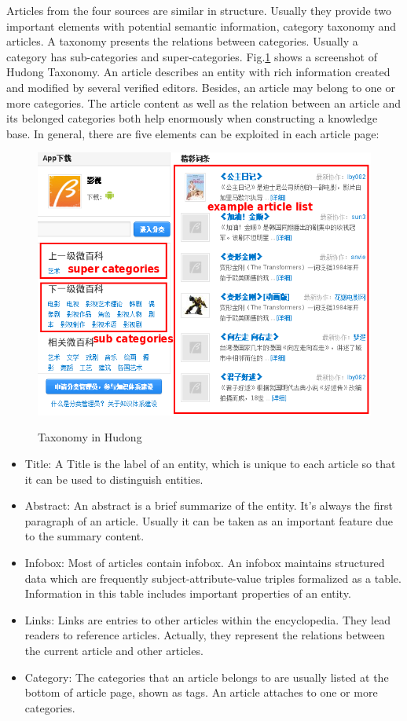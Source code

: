 \documentclass[runningheads,a4paper]{llncs}
\begin{document}
Articles from the four sources are similar in structure. Usually they provide two important elements with potential semantic information, category taxonomy and articles. A taxonomy presents the relations between categories. Usually a category has sub-categories and super-categories. Fig.\ref{fig:hudong-taxonomy} shows a screenshot of Hudong Taxonomy. An article describes an entity with rich information created and modified by several verified editors. Besides, an article may belong to one or more categories. The article content as well as the relation between an article and its belonged categories both help enormously when constructing a knowledge base. In general, there are five elements can be exploited in each article page:
\begin{figure}
    \centering
    \begin{minipage}[t]{0.8\textwidth}
        \centerline{\includegraphics[width=0.8\columnwidth]{fig/hudong-taxonomy2}}
        \label{fig:hudong-taxonomy}
        \caption{Taxonomy in Hudong}
    \end{minipage}%
\end{figure}
\begin{itemize}
  \item Title: A Title is the label of an entity, which is unique to each article so that it can be used to distinguish entities.
  \item Abstract: An abstract is a brief summarize of the entity. It's always the first paragraph of an article. Usually it can be taken as an important feature due to the summary content.
  \item Infobox: Most of articles contain infobox. An infobox maintains structured data which are frequently subject-attribute-value triples formalized as a table. Information in this table includes important properties of an entity.
  \item Links: Links are entries to other articles within the encyclopedia. They lead readers to reference articles. Actually, they represent the relations between the current article and other articles.
  \item Category: The categories that an article belongs to are usually listed at the bottom of article page, shown as tags. An article attaches to one or more categories.
\end{itemize}
\end{document}

